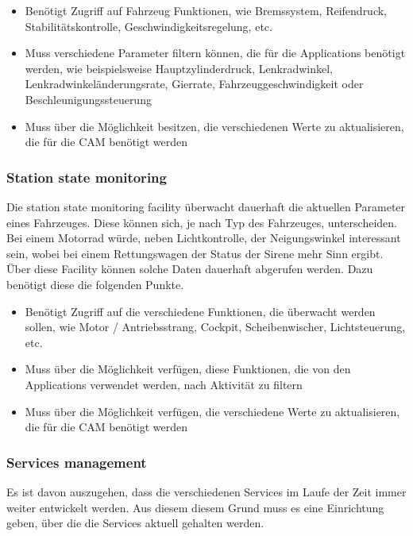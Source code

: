 \begin{itemize}
	\item Benötigt Zugriff auf Fahrzeug Funktionen, wie Bremssystem, Reifendruck, Stabilitätskontrolle, Geschwindigkeitsregelung, etc.
	\item Muss verschiedene Parameter filtern können, die für die Applications benötigt werden, wie beispielsweise Hauptzylinderdruck, Lenkradwinkel, Lenk\-rad\-win\-kel\-än\-der\-ung\-sra\-te, Gierrate, Fahrzeuggeschwindigkeit oder Beschleunigungssteuerung
	\item Muss über die Möglichkeit besitzen, die verschiedenen Werte zu aktualisieren, die für die \ac{CAM} benötigt werden
\end{itemize}

\subsubsection{Station state monitoring \label{facilitylayer_StationStateMonitoring}}
Die station state monitoring facility überwacht dauerhaft die aktuellen Parameter eines Fahrzeuges. Diese können sich, je nach Typ des Fahrzeuges, unterscheiden. Bei einem Motorrad würde, neben Lichtkontrolle, der Neigungswinkel interessant sein, wobei bei einem Rettungswagen der Status der Sirene mehr Sinn ergibt. Über diese Facility können solche Daten dauerhaft abgerufen werden. 
Dazu benötigt diese die folgenden Punkte.
\begin{itemize}
	\item Benötigt Zugriff auf die verschiedene Funktionen, die überwacht werden sollen, wie Motor / Antriebsstrang, Cockpit, Scheibenwischer, Lichtsteuerung, etc.
	\item Muss über die Möglichkeit verfügen, diese Funktionen, die von den Applications verwendet werden, nach Aktivität zu filtern
	\item Muss über die Möglichkeit verfügen, die verschiedene Werte zu aktualisieren, die für die \ac{CAM} benötigt werden
\end{itemize}

\subsubsection{Services management \label{facilitylayer_ServicesManagement} }
Es ist davon auszugehen, dass die verschiedenen Services im Laufe der Zeit immer weiter entwickelt werden. Aus diesem diesem Grund muss es eine Einrichtung geben, über die die Services aktuell gehalten werden.

